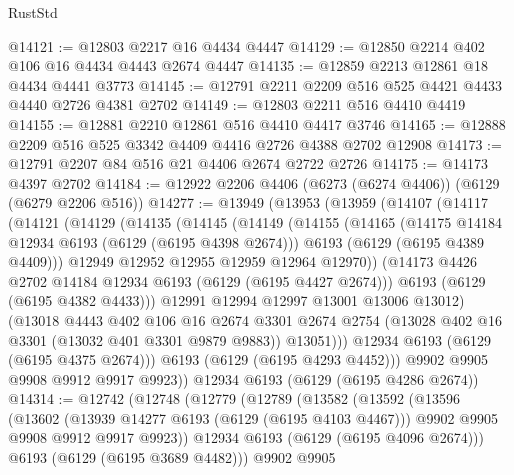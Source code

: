 \begin{lexlean}{RustStd}
\begin{coremodule}
@14121 := @12803 @2217 @16 @4434 @4447
@14129 := @12850 @2214 @402 @106 @16 @4434 @4443 @2674 @4447
@14135 := @12859 @2213 @12861 @18 @4434 @4441 @3773
@14145 := @12791 @2211 @2209 @516 @525 @4421 @4433 @4440 @2726 @4381 @2702
@14149 := @12803 @2211 @516 @4410 @4419
@14155 := @12881 @2210 @12861 @516 @4410 @4417 @3746
@14165 := @12888 @2209 @516 @525 @3342 @4409 @4416 @2726 @4388 @2702 @12908
@14173 := @12791 @2207 @84 @516 @21 @4406 @2674 @2722 @2726
@14175 := @14173 @4397 @2702
@14184 := @12922 @2206 @4406 (@6273 (@6274 @4406)) (@6129 (@6279 @2206 @516))
@14277 := @13949
    (@13953
      (@13959
        (@14107
          (@14117
            (@14121
              (@14129
                (@14135
                  (@14145
                    (@14149
                      (@14155
                        (@14165
                          (@14175 @14184 @12934 @6193 (@6129 (@6195 @4398 @2674)))
                          @6193
                          (@6129 (@6195 @4389 @4409)))
                        @12949
                        @12952
                        @12955
                        @12959
                        @12964
                        @12970))
                    (@14173 @4426 @2702 @14184 @12934 @6193 (@6129 (@6195 @4427 @2674)))
                    @6193
                    (@6129 (@6195 @4382 @4433)))
                  @12991
                  @12994
                  @12997
                  @13001
                  @13006
                  @13012)
                (@13018
                  @4443
                  @402
                  @106
                  @16
                  @2674
                  @3301
                  @2674
                  @2754
                  (@13028 @402 @16 @3301 (@13032 @401 @3301 @9879 @9883))
                  @13051)))
            @12934
            @6193
            (@6129 (@6195 @4375 @2674)))
          @6193
          (@6129 (@6195 @4293 @4452)))
        @9902
        @9905
        @9908
        @9912
        @9917
        @9923))
    @12934
    @6193
    (@6129 (@6195 @4286 @2674))
@14314 := @12742
    (@12748
      (@12779
        (@12789
          (@13582
            (@13592
              (@13596
                (@13602
                  (@13939 @14277 @6193 (@6129 (@6195 @4103 @4467)))
                  @9902
                  @9905
                  @9908
                  @9912
                  @9917
                  @9923))
              @12934
              @6193
              (@6129 (@6195 @4096 @2674)))
            @6193
            (@6129 (@6195 @3689 @4482)))
          @9902
          @9905

\end{coremodule}
\end{lexlean}
